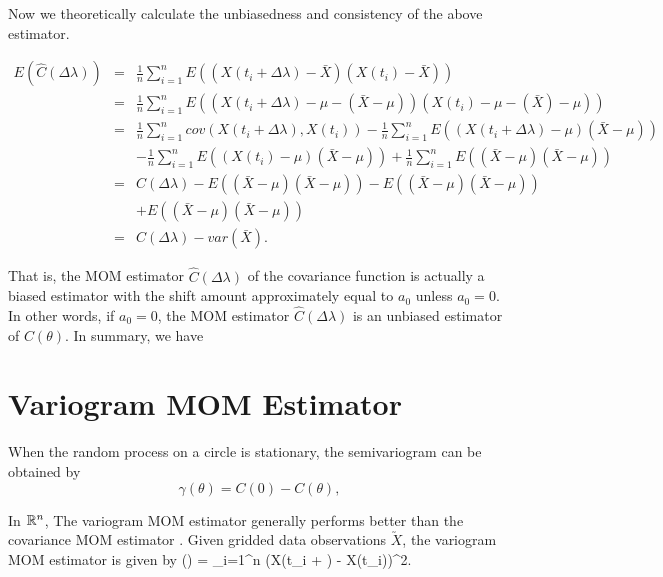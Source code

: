 Now we theoretically calculate the unbiasedness and consistency of the above estimator.

\begin{eqnarray*}
	E(\hat{C}(\Delta \lambda)) &=& \frac{1}{n}\sum_{i = 1}^n E((X(t_i + \Delta \lambda) - \bar{X})(X(t_i) - \bar{X})) \\
	&=& \frac{1}{n}\sum_{i = 1}^n E((X(t_i + \Delta \lambda) - \mu - (\bar{X} - \mu))(X(t_i) -\mu - (\bar{X}) - \mu)) \\
	&=& \frac{1}{n}\sum_{i=1}^n cov(X(t_i+\Delta \lambda), X(t_i)) - \frac{1}{n}\sum_{i = 1}^n E((X(t_i + \Delta \lambda) - \mu)(\bar{X} - \mu)) \\
	& & -\frac{1}{n}\sum_{i = 1}^n E((X(t_i) - \mu)(\bar{X} - \mu)) + \frac{1}{n}\sum_{i = 1}^n E((\bar{X} - \mu)(\bar{X} - \mu)) \\
	&=& C(\Delta \lambda) -E((\bar{X} - \mu)(\bar{X} - \mu)) - E((\bar{X} - \mu)(\bar{X} - \mu)) \\
	& & + E((\bar{X} - \mu)(\bar{X} - \mu)) \\
	&=& C(\Delta \lambda) - var(\bar{X}).
\end{eqnarray*}

That is, the MOM estimator $\hat{C}(\Delta \lambda)$ of the covariance function is actually a biased estimator with the shift amount approximately equal to $a_0$ unless $a_0 = 0$. In other words, if $a_0 = 0$, the MOM estimator $\hat{C}(\Delta \lambda)$ is an unbiased estimator of $C(\theta)$. In summary, we have \\


\section{Variogram MOM Estimator}

When the random process on a circle is stationary, the semivariogram can be obtained by
\[
\gamma(\theta) = C(0) - C(\theta),
\]

In $\mathbb{R}^n$, The variogram MOM estimator generally performs better than the covariance MOM estimator \cite{Cressie1993}. Given gridded data observations $\utilde{X}$, the variogram MOM estimator is given by
\beq
\hat{\gamma}(\Delta \lambda) =  \sum_{i=1}^n (X(t_i + \Delta \lambda) - X(t_i))^2.
\eeq

